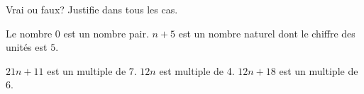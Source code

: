%
%
Vrai ou faux? Justifie dans tous les cas.
    \begin{tasks}
        \task Le nombre 0 est un nombre pair.
        \task $n + 5$ est un nombre naturel dont le chiffre des unités est $5$.

        \task $21n + 11$ est un multiple de $7$.
        \task $12n$ est multiple de 4.
        \task $12n + 18$ est un multiple de $6$.
    \end{tasks}
